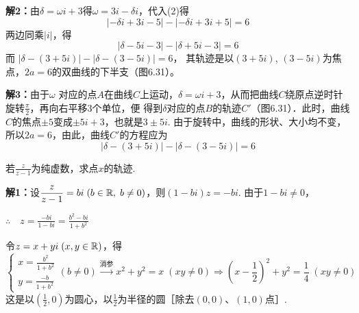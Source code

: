 \noindent
\begin{minipage}{.55\textwidth}\CTEXindent
\textbf{解2：}由$\delta =\omega i+3$得$\omega =3i-\delta i$，代入(2)得
\[|-\delta i+3i-5|-|-\delta i+3i+5|=6\]
两边同乘$|i|$，得
\[|\delta -5i-3|-|\delta +5i-3|=6\]
而
$|\delta -(3+5i)|-|\delta -(3-5i)|=6$，
其轨迹是以$(3+5i)$, $(3-5i)$为焦点，$2a=6$的双曲线的下半支（图6.31）。    
\end{minipage}
\begin{minipage}{.4\textwidth}
\centering
{}
\end{minipage}


\textbf{解3：}由于$\omega$ 对应的点$A$在曲线$C$上运动，$\delta =\omega i+3$，从而把曲线$C$绕原点逆时针旋转$\frac{\pi}{2}$，再向右平移3个单位，便
得到$\delta $对应的点$B$的轨迹$C'$（图6.31）．此时，曲线$C$的焦点$\pm 5$变成$\pm 5i+3$，也就是$3\pm 5i$. 由于旋转中，曲线的形状、大小均不变，所以$2a=6$，由此，曲线$C'$的方程应为
\[|\delta -(3+5i)|-|\delta -(3-5i)|=6\]



\begin{example}
    若$\frac{z}{z-1}$为纯虚数，求点$x$的轨迹.
\end{example}


\textbf{解1：}设$\dfrac{z}{z-1}=bi\; (b\in\mathbb{R},\; b\ne 0)$，则$(1-bi)z=-bi$. 由于$1-bi\ne 0$，

$\therefore\quad z=\frac{-bi}{1-bi}=\frac{b^2-bi}{1+b^2}$

令$z=x+yi\; (x,y\in\mathbb{R})$，得
\[\begin{cases}
x=\frac{b^2}{1+b^2}
\\[1.5ex]
y=\frac{-b}{1+b^2}
\end{cases}(b\ne 0) \xrightarrow[]{\text{消参}}x^2+y^2=x\; (xy\ne 0)\Rightarrow \left(x-\frac{1}{2}\right)^2+y^2=\frac{1}{4}\; (xy\ne 0) \]
这是以$\left(\frac{1}{2},0\right)$为圆心，以$\frac{1}{2}$为半径的圆［除去$(0,0)$、$(1,0)$点］.

